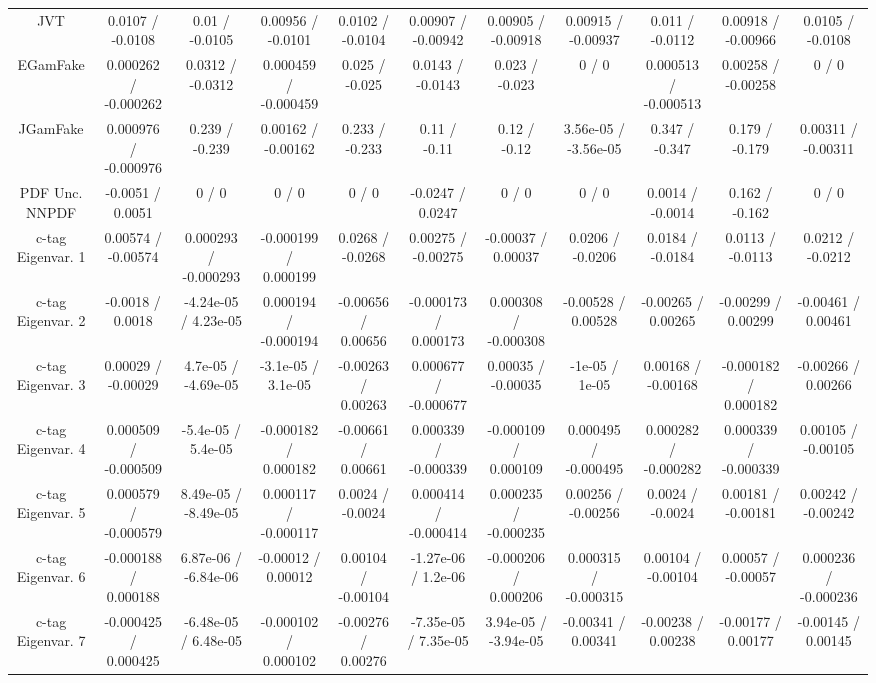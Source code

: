 \begin{table}[htbp]
\begin{center}
\begin{tabular}{|c|c|c|c|c|c|c|c|c|c|c|}
  JVT & 0.0107 / -0.0108 & 0.01 / -0.0105 & 0.00956 / -0.0101 & 0.0102 / -0.0104 & 0.00907 / -0.00942 & 0.00905 / -0.00918 & 0.00915 / -0.00937 & 0.011 / -0.0112 & 0.00918 / -0.00966 & 0.0105 / -0.0108 \\ 
  EGamFake & 0.000262 / -0.000262 & 0.0312 / -0.0312 & 0.000459 / -0.000459 & 0.025 / -0.025 & 0.0143 / -0.0143 & 0.023 / -0.023 & 0 / 0 & 0.000513 / -0.000513 & 0.00258 / -0.00258 & 0 / 0 \\ 
  JGamFake & 0.000976 / -0.000976 & 0.239 / -0.239 & 0.00162 / -0.00162 & 0.233 / -0.233 & 0.11 / -0.11 & 0.12 / -0.12 & 3.56e-05 / -3.56e-05 & 0.347 / -0.347 & 0.179 / -0.179 & 0.00311 / -0.00311 \\ 
  PDF Unc. NNPDF & -0.0051 / 0.0051 & 0 / 0 & 0 / 0 & 0 / 0 & -0.0247 / 0.0247 & 0 / 0 & 0 / 0 & 0.0014 / -0.0014 & 0.162 / -0.162 & 0 / 0 \\ 
  c-tag Eigenvar. 1 & 0.00574 / -0.00574 & 0.000293 / -0.000293 & -0.000199 / 0.000199 & 0.0268 / -0.0268 & 0.00275 / -0.00275 & -0.00037 / 0.00037 & 0.0206 / -0.0206 & 0.0184 / -0.0184 & 0.0113 / -0.0113 & 0.0212 / -0.0212 \\ 
  c-tag Eigenvar. 2 & -0.0018 / 0.0018 & -4.24e-05 / 4.23e-05 & 0.000194 / -0.000194 & -0.00656 / 0.00656 & -0.000173 / 0.000173 & 0.000308 / -0.000308 & -0.00528 / 0.00528 & -0.00265 / 0.00265 & -0.00299 / 0.00299 & -0.00461 / 0.00461 \\ 
  c-tag Eigenvar. 3 & 0.00029 / -0.00029 & 4.7e-05 / -4.69e-05 & -3.1e-05 / 3.1e-05 & -0.00263 / 0.00263 & 0.000677 / -0.000677 & 0.00035 / -0.00035 & -1e-05 / 1e-05 & 0.00168 / -0.00168 & -0.000182 / 0.000182 & -0.00266 / 0.00266 \\ 
  c-tag Eigenvar. 4 & 0.000509 / -0.000509 & -5.4e-05 / 5.4e-05 & -0.000182 / 0.000182 & -0.00661 / 0.00661 & 0.000339 / -0.000339 & -0.000109 / 0.000109 & 0.000495 / -0.000495 & 0.000282 / -0.000282 & 0.000339 / -0.000339 & 0.00105 / -0.00105 \\ 
  c-tag Eigenvar. 5 & 0.000579 / -0.000579 & 8.49e-05 / -8.49e-05 & 0.000117 / -0.000117 & 0.0024 / -0.0024 & 0.000414 / -0.000414 & 0.000235 / -0.000235 & 0.00256 / -0.00256 & 0.0024 / -0.0024 & 0.00181 / -0.00181 & 0.00242 / -0.00242 \\ 
  c-tag Eigenvar. 6 & -0.000188 / 0.000188 & 6.87e-06 / -6.84e-06 & -0.00012 / 0.00012 & 0.00104 / -0.00104 & -1.27e-06 / 1.2e-06 & -0.000206 / 0.000206 & 0.000315 / -0.000315 & 0.00104 / -0.00104 & 0.00057 / -0.00057 & 0.000236 / -0.000236 \\ 
  c-tag Eigenvar. 7 & -0.000425 / 0.000425 & -6.48e-05 / 6.48e-05 & -0.000102 / 0.000102 & -0.00276 / 0.00276 & -7.35e-05 / 7.35e-05 & 3.94e-05 / -3.94e-05 & -0.00341 / 0.00341 & -0.00238 / 0.00238 & -0.00177 / 0.00177 & -0.00145 / 0.00145 \\ 

\end{tabular}
\end{center}
\end{table}
